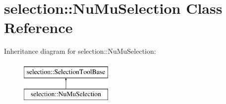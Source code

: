 \hypertarget{classselection_1_1NuMuSelection}{}\section{selection\+:\+:Nu\+Mu\+Selection Class Reference}
\label{classselection_1_1NuMuSelection}
Inheritance diagram for selection\+:\+:Nu\+Mu\+Selection\+:\begin{figure}[H]
\begin{center}
\leavevmode
\includegraphics[height=2.000000cm]{classselection_1_1NuMuSelection}
\end{center}
\end{figure}
